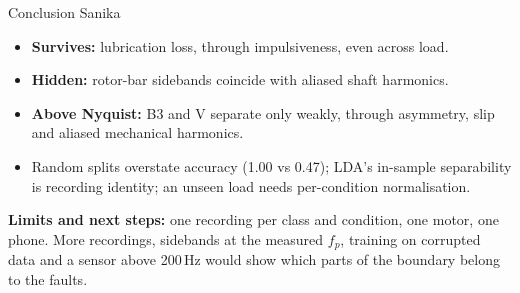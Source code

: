 \documentclass[aspectratio=169,11pt]{beamer}
\newcommand{\who}[1]{\hfill{\footnotesize\color{gray}#1}}
\begin{document}
\begin{frame}{Conclusion \who{Sanika}}
  \begin{itemize}
    \item \textbf{Survives:} lubrication loss, through impulsiveness, even across load.
    \item \textbf{Hidden:} rotor-bar sidebands coincide with aliased shaft harmonics.
    \item \textbf{Above Nyquist:} B3 and V separate only weakly, through asymmetry, slip and
          aliased mechanical harmonics.
    \item Random splits overstate accuracy (1.00 vs 0.47); LDA's in-sample separability is
          recording identity; an unseen load needs per-condition normalisation.
  \end{itemize}
  \vspace{0.5em}
  \textbf{Limits and next steps:} one recording per class and condition, one motor, one
  phone. More recordings, sidebands at the measured $f_p$, training on corrupted data and a
  sensor above 200\,Hz would show which parts of the boundary belong to the faults.
\end{frame}
\end{document}
